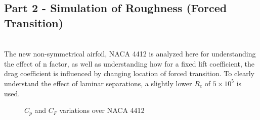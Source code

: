 \documentclass[main.tex]{subfiles}
\begin{document}
\subsection{Part 2 - Simulation of Roughness (Forced Transition)}
\\\indent The new non-symmetrical airfoil, NACA 4412 is analyzed here for understanding the effect of n factor, as well as understanding how for a fixed lift coefficient, the drag coefficient is influenced by changing location of forced transition. To clearly understand the effect of laminar separations, a slightly lower $R_e$ of $5\times10^{5}$ is used.\vspace*{-1.7em}
\begin{figure}[h!]
    \centering
     \hspace*{-1.2em}
    \vspace*{-0.5em}
    \caption{$C_p$ and $C_F$ variations over NACA 4412}
    \label{fig3}
\end{figure}
\end{document}
